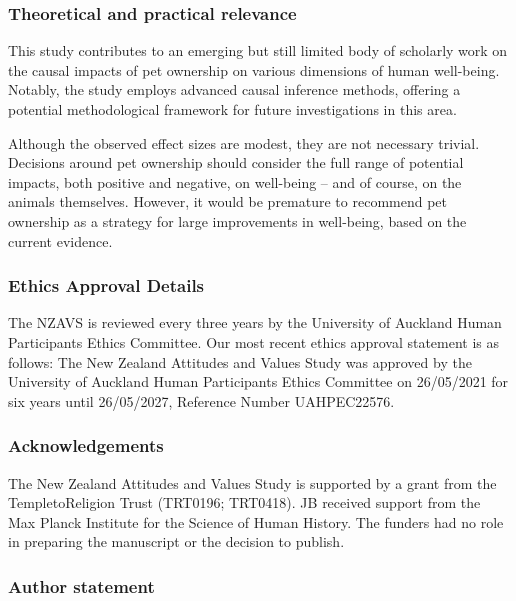 \documentclass[
  singlecolumn,
  9pt]{article}
\begin{document}
\subsubsection{Theoretical and practical
relevance}\label{theoretical-and-practical-relevance}

This study contributes to an emerging but still limited body of
scholarly work on the causal impacts of pet ownership on various
dimensions of human well-being. Notably, the study employs advanced
causal inference methods, offering a potential methodological framework
for future investigations in this area.

Although the observed effect sizes are modest, they are not necessary
trivial. Decisions around pet ownership should consider the full range
of potential impacts, both positive and negative, on well-being -- and
of course, on the animals themselves. However, it would be premature to
recommend pet ownership as a strategy for large improvements in
well-being, based on the current evidence.

\newpage{}

\subsubsection{Ethics Approval Details}\label{ethics-approval-details}

The NZAVS is reviewed every three years by the University of Auckland
Human Participants Ethics Committee. Our most recent ethics approval
statement is as follows: The New Zealand Attitudes and Values Study was
approved by the University of Auckland Human Participants Ethics
Committee on 26/05/2021 for six years until 26/05/2027, Reference Number
UAHPEC22576.

\subsubsection{Acknowledgements}\label{acknowledgements}

The New Zealand Attitudes and Values Study is supported by a grant from
the TempletoReligion Trust (TRT0196; TRT0418). JB received support from
the Max Planck Institute for the Science of Human History. The funders
had no role in preparing the manuscript or the decision to publish.

\subsubsection{Author statement}\label{author-statement}
\end{document}
